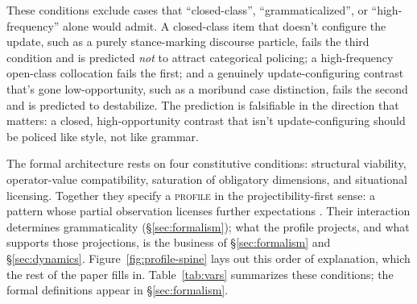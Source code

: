 \documentclass[12pt,letterpaper]{article}
\newcommand{\term}[1]{\textsc{#1}}
\begin{document}
These conditions exclude cases that \enquote{closed-class}, \enquote{grammaticalized}, or \enquote{high-frequency} alone would admit. A closed-class item that doesn't configure the update, such as a purely stance-marking discourse particle, fails the third condition and is predicted \emph{not} to attract categorical policing; a high-frequency open-class collocation fails the first; and a genuinely update-configuring contrast that's gone low-opportunity, such as a moribund case distinction, fails the second and is predicted to destabilize. The prediction is falsifiable in the direction that matters: a closed, high-opportunity contrast that isn't update-configuring should be policed like style, not like grammar.

The formal architecture rests on four constitutive conditions: structural viability, operator-value compatibility, saturation of obligatory dimensions, and situational licensing. Together they specify a \term{profile} in the projectibility-first sense: a pattern whose partial observation licenses further expectations \autocite{reynolds2026kindsProjectibilityProfiles}. Their interaction determines grammaticality (\S\ref{sec:formalism}); what the profile projects, and what supports those projections, is the business of \S\ref{sec:formalism} and \S\ref{sec:dynamics}. Figure~\ref{fig:profile-spine} lays out this order of explanation, which the rest of the paper fills in. Table~\ref{tab:vars} summarizes these conditions; the formal definitions appear in \S\ref{sec:formalism}.
\end{document}
